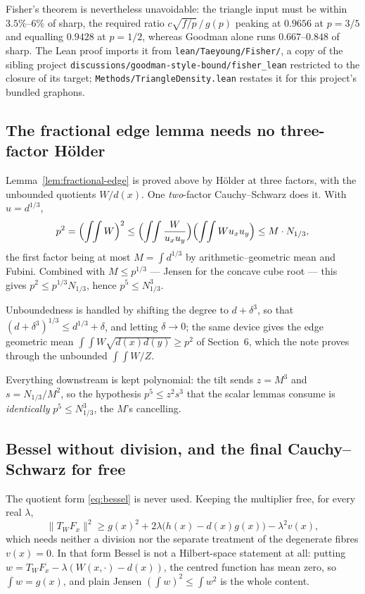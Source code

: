 \documentclass[11pt]{article}
\begin{document}
Fisher's theorem is nevertheless unavoidable: the triangle input must be
within $3.5\%$--$6\%$ of sharp, the required ratio $c\sqrt{f/p}\,/\,g(p)$
peaking at $0.9656$ at $p=3/5$ and equalling $0.9428$ at $p=1/2$, whereas
Goodman alone runs $0.667$--$0.848$ of sharp.  The Lean proof imports it from
\texttt{lean/Taeyoung/Fisher/}, a copy of the sibling project
\texttt{discussions/goodman-style-bound/fisher\_lean} restricted to the closure
of its target; \texttt{Methods/TriangleDensity.lean} restates it for this
project's bundled graphons.

\subsection{The fractional edge lemma needs no three-factor H\"older}
\label{sec:app148-holder}

Lemma~\ref{lem:fractional-edge} is proved above by H\"older at three factors,
with the unbounded quotients $W/d(x)$.  One \emph{two}-factor Cauchy--Schwarz
does it.  With $u=d^{1/3}$,
\[
 p^2=\Bigl(\int\!\!\int W\Bigr)^2
 \leq\Bigl(\int\!\!\int \frac{W}{u_xu_y}\Bigr)
      \Bigl(\int\!\!\int W u_xu_y\Bigr)
 \leq M\cdot N_{1/3},
\]
the first factor being at most $M=\int d^{1/3}$ by arithmetic--geometric mean
and Fubini.  Combined with $M\leq p^{1/3}$ — Jensen for the concave cube root
— this gives $p^2\leq p^{1/3}N_{1/3}$, hence $p^5\leq N_{1/3}^3$.

Unboundedness is handled by shifting the degree to $d+\delta^3$, so that
$(d+\delta^3)^{1/3}\leq d^{1/3}+\delta$, and letting $\delta\to0$; the same
device gives the edge geometric mean $\int\!\!\int W\sqrt{d(x)d(y)}\geq p^2$
of Section~6, which the note proves through the unbounded $\int\!\!\int W/Z$.

Everything downstream is kept polynomial: the tilt sends $z=M^3$ and
$s=N_{1/3}/M^2$, so the hypothesis $p^5\leq z^2s^3$ that the scalar lemmas
consume is \emph{identically} $p^5\leq N_{1/3}^3$, the $M$'s cancelling.

\subsection{Bessel without division, and the final Cauchy--Schwarz for free}
\label{sec:app148-bessel}

The quotient form \eqref{eq:bessel} is never used.  Keeping the multiplier
free, for every real $\lambda$,
\[
 \lVert T_WF_x\rVert^2\geq g(x)^2+2\lambda\bigl(h(x)-d(x)g(x)\bigr)
 -\lambda^2v(x),
\]
which needs neither a division nor the separate treatment of the degenerate
fibres $v(x)=0$.  In that form Bessel is not a Hilbert-space statement at all:
putting $w=T_WF_x-\lambda(W(x,\cdot)-d(x))$, the centred function has mean
zero, so $\int w=g(x)$, and plain Jensen $(\int w)^2\leq\int w^2$ is the whole
content.
\end{document}
